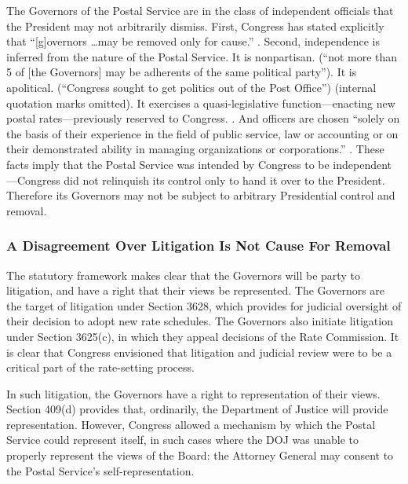 \documentclass[12pt,\documentclassflag]{lawbrief}
\begin{document}
The Governors of the Postal Service are in the class of independent officials that the President may not arbitrarily dismiss.  First, Congress has stated explicitly that ``[g]overnors \ldots may be removed only for cause.'' .  Second, independence is inferred from the nature of the Postal Service.  It is nonpartisan.  \See  {} (``not more than 5 of [the Governors] may be adherents of the same political party'').  It is apolitical. \See {} (``Congress sought to get politics out of the Post Office'') (internal quotation marks omitted). It exercises a quasi-legislative function---enacting new postal rates---previously reserved to Congress. \See {}. And officers are chosen ``solely on the basis of their experience in the field of public service, law or accounting or on their demonstrated ability in managing organizations or corporations.'' .  These facts imply that the Postal Service was intended by Congress to be independent---Congress did not relinquish its control only to hand it over to the President.  Therefore its Governors may not be subject to arbitrary Presidential control and removal.

\subsubsection{A Disagreement Over Litigation Is Not Cause For Removal}

The statutory framework makes clear that the Governors will be party to litigation, and have a right that their views be represented.   The Governors are the target of litigation under Section 3628, which provides for judicial oversight of their decision to adopt new rate schedules.  The Governors also initiate litigation under Section 3625(c), in which they appeal decisions of the Rate Commission.  It is clear that Congress envisioned that litigation and judicial review were to be a critical part of the rate-setting process. 

In such litigation, the Governors have a right to representation of their views.  Section 409(d) provides that, ordinarily, the Department of Justice will provide representation.  However, Congress allowed a mechanism by which the Postal Service could represent itself, in such cases where the DOJ was unable to properly represent the views of the Board: the Attorney General may consent to the Postal Service's self-representation. 
\end{document}
